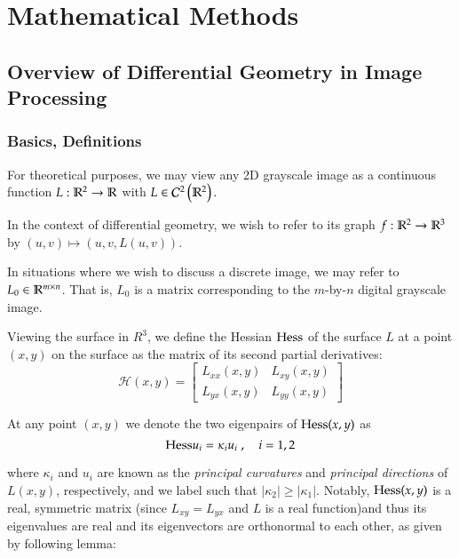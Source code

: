\chapter{Mathematical Methods}

\section{Overview of Differential Geometry in Image Processing}
	\subsection{Basics, Definitions}
        \begin{defn}
    	For theoretical purposes, we may view any 2D grayscale image
    	as a continuous function $L: \mathbb{R}^2 \to \mathbb{R}$
        with $L \in \mathcal{C}^2\left(\mathbb{R}^2\right).$
        \end{defn}
        \begin{defn}
        In the context of differential geometry, we wish to refer to its graph
            $f: \mathbb{R}^2 \to \mathbb{R}^3 $ by $ (u,v) \mapsto (u, v, L(u,v))$.
    	\end{defn}
        \begin{defn}
    In situations where we wish to discuss a discrete image, we may refer to
	$L_0 \in \mathbb{R}^{m\times n}$. That is, $L_0$ is a matrix corresponding to the $m$-by-$n$ digital grayscale image. 
    \end{defn}
	
	
	Viewing the surface in $R^3$, we define the Hessian $\mathrm{Hess}$ of the surface $L$
	at a point $(x,y)$ on the surface as the matrix of its second partial derivatives:
	\begin{equation}
\mathcal{H}(x,y) = \begin{bmatrix}
		L_{xx}(x,y) & L_{xy}(x,y) \\
		L_{yx}(x,y) & L_{yy}(x,y)
	\end{bmatrix}
	\end{equation}
	
	At any point $(x,y)$ we denote the two eigenpairs of $\mathrm{Hess}(x,y)$ as
	\begin{equation}
		\mathrm{Hess} u_i = \kappa_i u_i \; , \quad i = 1,2
	\end{equation}
	
	where $\kappa_i$ and $u_i$ are known as the
	\textit{principal curvatures} and \textit{principal directions} of $L(x,y)$, respectively, and we label such that $|\kappa_2| \ge |\kappa_1|$. Notably, $\mathrm{Hess}(x,y)$ is a real, symmetric matrix (since  $L_{xy} = L_{yx}$ and $L$ is a real function)and thus its eigenvalues are real and its eigenvectors are orthonormal to each other, as given by following lemma:
	

